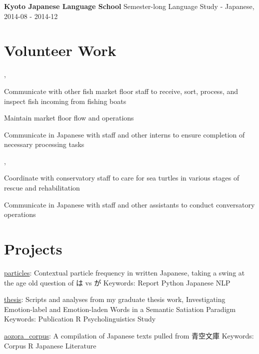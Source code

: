 \documentclass[letterpaper]{deedy-resume_sm}
\begin{document}
\textbf{Kyoto Japanese Language School}
Semester-long Language Study - Japanese, 2014-08 - 2014-12

\section{Volunteer Work}
, 
\begin{tightitemize}
\item Communicate with other fish market floor staff to receive, sort, process, and inspect fish incoming from fishing boats
\item Maintain market floor flow and operations
\item Communicate in Japanese with staff and other interns to ensure completion of necessary processing tasks
\end{tightitemize}
\sectionspace

, 
\begin{tightitemize}
\item Coordinate with conservatory staff to care for sea turtles in various stages of rescue and rehabilitation
\item Communicate in Japanese with staff and other assistants to conduct conversatory operations
\end{tightitemize}
\sectionspace

\section{Projects}
\href{https://github.com/ryancahildebrandt/particles}{particles}: Contextual particle frequency in written Japanese, taking a swing at the age old question of は vs が
Keywords: Report \textbullet{} Python \textbullet{} Japanese \textbullet{} NLP

\href{https://github.com/ryancahildebrandt/thesis}{thesis}: Scripts and analyses from my graduate thesis work, Investigating Emotion-label and Emotion-laden Words in a Semantic Satiation Paradigm
Keywords: Publication \textbullet{} R \textbullet{} Psycholinguistics \textbullet{} Study

\href{https://github.com/ryancahildebrandt/aozora_corpus}{aozora{\_}corpus}: A compilation of Japanese texts pulled from 青空文庫
Keywords: Corpus \textbullet{} R \textbullet{} Japanese \textbullet{} Literature
\end{document}
